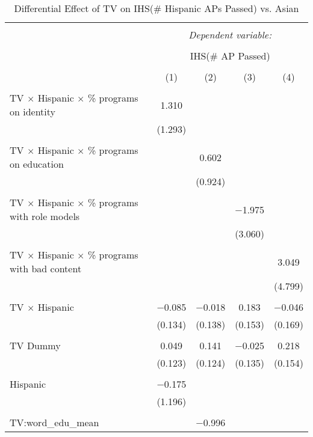 
\begin{table}[!htbp] \centering 
  \caption{Differential Effect of TV on IHS(\# Hispanic APs Passed) vs. Asian} 
  \label{} 
\begin{tabular}{@{\extracolsep{-2pt}}lcccc} 
\\[-1.8ex]\hline 
\hline \\[-1.8ex] 
 & \multicolumn{4}{c}{\textit{Dependent variable:}} \\ 
\cline{2-5} 
\\[-1.8ex] & \multicolumn{4}{c}{IHS(\# AP Passed)} \\ 
\\[-1.8ex] & (1) & (2) & (3) & (4)\\ 
\hline \\[-1.8ex] 
 TV $\times$ Hispanic $\times$ \% programs on identity & 1.310 &  &  &  \\ 
  & (1.293) &  &  &  \\ 
  & & & & \\ 
 TV $\times$ Hispanic $\times$ \% programs on education &  & 0.602 &  &  \\ 
  &  & (0.924) &  &  \\ 
  & & & & \\ 
 TV $\times$ Hispanic $\times$ \% programs with role models &  &  & $-$1.975 &  \\ 
  &  &  & (3.060) &  \\ 
  & & & & \\ 
 TV $\times$ Hispanic $\times$ \% programs with bad content &  &  &  & 3.049 \\ 
  &  &  &  & (4.799) \\ 
  & & & & \\ 
 TV $\times$ Hispanic & $-$0.085 & $-$0.018 & 0.183 & $-$0.046 \\ 
  & (0.134) & (0.138) & (0.153) & (0.169) \\ 
  & & & & \\ 
 TV Dummy & 0.049 & 0.141 & $-$0.025 & 0.218 \\ 
  & (0.123) & (0.124) & (0.135) & (0.154) \\ 
  & & & & \\ 
 Hispanic & $-$0.175 &  &  &  \\ 
  & (1.196) &  &  &  \\ 
  & & & & \\ 
 TV:word\_edu\_mean &  & $-$0.996 &  &  \\ 

\end{tabular}
\end{table}
